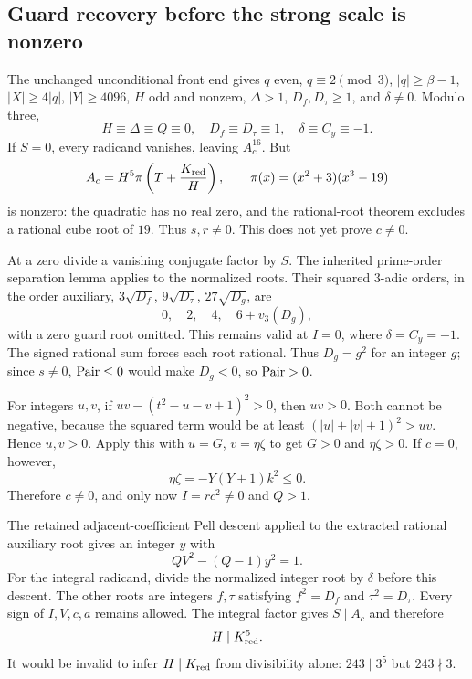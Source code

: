 \subsection{Guard recovery before the strong scale is nonzero}
The unchanged unconditional front end gives $q$ even, $q\equiv2\pmod3$, $|q|\ge\beta-1$, $|X|\ge4|q|$, $|Y|\ge4096$, $H$ odd and nonzero, $\Delta>1$, $D_f,D_\tau\ge1$, and $\delta\ne0$. Modulo three,
\[
 H\equiv\Delta\equiv Q\equiv0,\quad
 D_f\equiv D_\tau\equiv1,\quad\delta\equiv C_y\equiv-1.
\]
If $S=0$, every radicand vanishes, leaving $A_c^{16}$. But
\[
 A_c=H^5\pi\left(T+\frac{K_{\mathrm{red}}}{H}\right),\qquad
 \pi(x)=(x^2+3)(x^3-19)
\]
is nonzero: the quadratic has no real zero, and the rational-root theorem excludes a rational cube root of $19$. Thus $s,r\ne0$. This does not yet prove $c\ne0$.

At a zero divide a vanishing conjugate factor by $S$. The inherited prime-order separation lemma applies to the normalized roots. Their squared $3$-adic orders, in the order auxiliary, $3\sqrt{D_f}$, $9\sqrt{D_\tau}$, $27\sqrt{D_g}$, are
\[
 0,\quad2,\quad4,\quad6+v_3(D_g),
\]
with a zero guard root omitted. This remains valid at $I=0$, where $\delta=C_y=-1$. The signed rational sum forces each root rational. Thus $D_g=g^2$ for an integer $g$; since $s\ne0$, $\operatorname{Pair}\le0$ would make $D_g<0$, so $\operatorname{Pair}>0$.

For integers $u,v$, if $uv-(t^2-u-v+1)^2>0$, then $uv>0$. Both cannot be negative, because the squared term would be at least $(|u|+|v|+1)^2>uv$. Hence $u,v>0$. Apply this with $u=G$, $v=\eta\zeta$ to get $G>0$ and $\eta\zeta>0$. If $c=0$, however,
\[
 \eta\zeta=-Y(Y+1)k^2\le0.
\]
Therefore $c\ne0$, and only now $I=rc^2\ne0$ and $Q>1$.

The retained adjacent-coefficient Pell descent applied to the extracted rational auxiliary root gives an integer $y$ with
\begin{equation}\label{eq:auxpell}
 QV^2-(Q-1)y^2=1.
\end{equation}
For the integral radicand, divide the normalized integer root by $\delta$ before this descent. The other roots are integers $f,\tau$ satisfying $f^2=D_f$ and $\tau^2=D_\tau$. Every sign of $I,V,c,a$ remains allowed. The integral factor gives $S\mid A_c$ and therefore
\begin{equation}\label{eq:fifthdiv}H\mid K_{\mathrm{red}}^5.\end{equation}
It would be invalid to infer $H\mid K_{\mathrm{red}}$ from divisibility alone: $243\mid3^5$ but $243\nmid3$.

